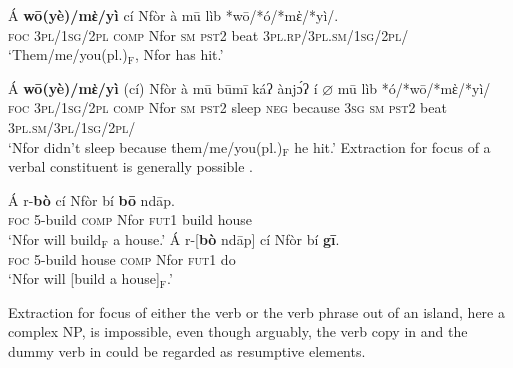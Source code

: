 \documentclass[output=paper]{langscibook}
\begin{document}
\ea \label{ex:johanneshein:haplologypronoun}
\gll Á \textbf{wō(yè)/mὲ/yì} cí Nfòr à mū lìb *wō/*ó/*mὲ/*yì/\gap{}.\\
\textsc{foc} \textsc{3pl/1sg/2pl} \textsc{comp} Nfor \textsc{sm} \textsc{pst2} beat \textsc{3pl.rp}/\textsc{3pl.sm}/\textsc{1sg}/\textsc{2pl}/\gap{}\\
\glt `Them/me/you(pl.)$_{\text{F}}$, Nfor has hit.'
\z

\ea\label{ex:johanneshein:noRP}
\begin{xlist}
\end{xlist}
\ex \label{ex:johanneshein:adj-island}
\gll Á \textbf{wō(yè)/mὲ/yì} (cí) Nfòr à mū būmī káʔ ànjɔ́ʔ í $\varnothing$ mū lìb *ó/*wō/*mὲ/*yì/\gap{}\\
\textsc{foc} \textsc{3pl/1sg/2pl} \textsc{comp} Nfor \textsc{sm} \textsc{pst2} sleep \textsc{neg} because \textsc{3sg} \textsc{sm} \textsc{pst2} beat \textsc{3pl.sm/3pl/1sg/2pl/}\gap{}\\
\glt `Nfor didn't sleep because them/me/you(pl.)$_{\text{F}}$ he hit.'
\z
Extraction for focus of a verbal constituent is generally possible .

\ea
\begin{xlist}
\ex \label{ex:johanneshein:VPfrontingNonisland}
\gll Á r-\textbf{bò} cí Nfòr bí \textbf{bō} ndāp.\\
\textsc{foc} 5-build \hphantom{(}\textsc{comp} Nfor \textsc{fut1} build house\\
\glt `Nfor will build$_{\text{F}}$ a house.'
\ex \label{ex:johanneshein:VPfronting1}
\gll Á r-[\textbf{bò} ndāp] cí Nfòr bí \textbf{gī}.\\
\textsc{foc} \hphantom{[}5-build house \hphantom{(}\textsc{comp} Nfor \textsc{fut1} do\\
\glt `Nfor will [build a house]$_{\text{F}}$.'
\end{xlist}
\z
Extraction for focus of either the verb
or the verb phrase out of an island, here a complex NP, is
impossible, even though arguably, the verb copy in  and the
dummy verb in  could be regarded as resumptive elements.
\end{document}

